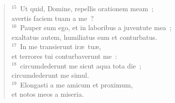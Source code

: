 \begin{verse}
${}^{15}$~Ut quid, Domine, repellis orationem meam~;\\ avertis faciem tuam a me~?\\
${}^{16}$~Pauper sum ego, et in laboribus a juventute mea~;\\ exaltatus autem, humiliatus sum et conturbatus.\\
${}^{17}$~In me transierunt ir\ae\ tu\ae ,\\ et terrores tui conturbaverunt me~:\\
${}^{18}$~circumdederunt me sicut aqua tota die~;\\ circumdederunt me simul.\\
${}^{19}$~Elongasti a me amicum et proximum,\\ et notos meos a miseria.\end{verse}



